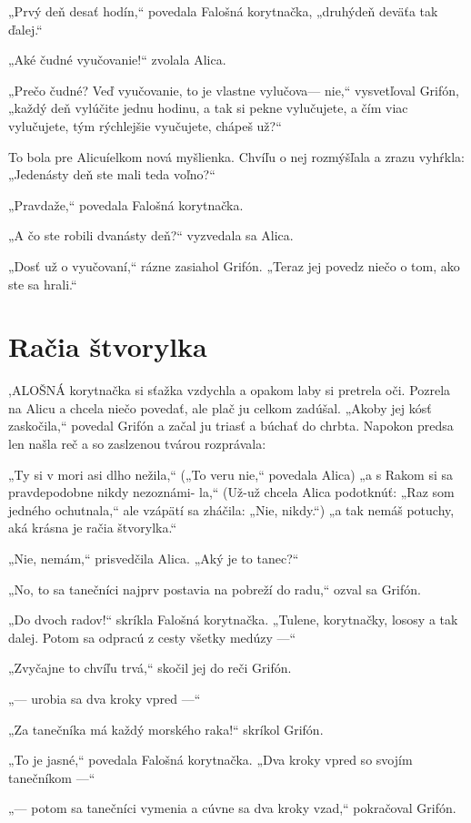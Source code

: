 \documentclass[12pt]{article}
\begin{document}
\begin{Parallel}[p]{}{}
{{„Prvý deň desať hodín,“ povedala Falošná korytnačka,
„druhýdeň deväťa tak ďalej.“

„Aké čudné vyučovanie!“ zvolala Alica.

„Prečo čudné? Veď vyučovanie, to je vlastne vylučova—
nie,“ vysvetľoval Grifón, „každý deň vylúčite jednu hodinu,
a tak si pekne vylučujete, a čím viac vylučujete, tým
rýchlejšie vyučujete, chápeš už?“

To bola pre Alicuíelkom nová myšlienka. Chvíľu o nej
rozmýšľala a zrazu vyhŕkla: „Jedenásty deň ste mali teda
voľno?“

„Pravdaže,“ povedala Falošná korytnačka.

„A čo ste robili dvanásty deň?“ vyzvedala sa Alica.

„Dosť už o vyučovaní,“ rázne zasiahol Grifón. „Teraz jej
povedz niečo o tom, ako ste sa hrali.“

\section{Račia štvorylka}

,ALOŠNÁ korytnačka si sťažka vzdychla a opakom
laby si pretrela oči. Pozrela na Alicu a chcela niečo
povedať, ale plač ju celkom zadúšal. „Akoby jej kósť
zaskočila,“ povedal Grifón a začal ju triasť a búchať do
chrbta. Napokon predsa len našla reč a so zaslzenou tvárou
rozprávala:

„Ty si v mori asi dlho nežila,“ („To veru nie,“ povedala
Alica) „a s Rakom si sa pravdepodobne nikdy nezoznámi-
la,“ (Už-už chcela Alica podotknúť: „Raz som jedného
ochutnala,“ ale vzápätí sa zháčila: „Nie, nikdy.“) „a tak
nemáš potuchy, aká krásna je račia štvorylka.“

„Nie, nemám,“ prisvedčila Alica. „Aký je to tanec?“

„No, to sa tanečníci najprv postavia na pobreží do radu,“
ozval sa Grifón.

„Do dvoch radov!“ skríkla Falošná korytnačka. „Tulene,
korytnačky, lososy a tak dalej. Potom sa odpracú z cesty
všetky medúzy —“

„Zvyčajne to chvíľu trvá,“ skočil jej do reči Grifón.

„— urobia sa dva kroky vpred —“

„Za tanečníka má každý morského raka!“ skríkol
Grifón.

„To je jasné,“ povedala Falošná korytnačka. „Dva kroky
vpred so svojím tanečníkom —“

„— potom sa tanečníci vymenia a cúvne sa dva kroky
vzad,“ pokračoval Grifón.

}}
\end{Parallel}
\end{document}

